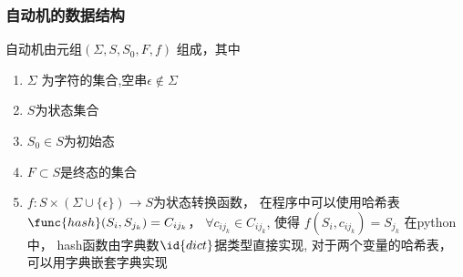 \documentclass[../main.tex]{subfiles}
\begin{document}
\subsubsection{自动机的数据结构}
  自动机由元组$(\Sigma,S,S_0,F,f)$
  组成，其中
  \begin{enumerate}
    \item $\Sigma$ 为字符的集合,空串$\epsilon \notin \Sigma$
    \item $S$为状态集合
    \item $S_0 \in S$为初始态
    \item $F \subset S$是终态的集合
    \item $f:S \times (\Sigma \cup \{ \epsilon\}) \to S$为状态转换函数，
      在程序中可以使用哈希表
      $\func{hash}(S_i,S_{j_k}) = C_{ij_k}$，
      $\forall c_{ij_k} \in C_{ij_k}$,
      使得
      $f(S_i,c_{ij_k}) = S_{j_k}$
      在python中，
      hash函数由字典数$\id{dict}$据类型直接实现,
      对于两个变量的哈希表，
      可以用字典嵌套字典实现
  \end{enumerate}
\end{document}
